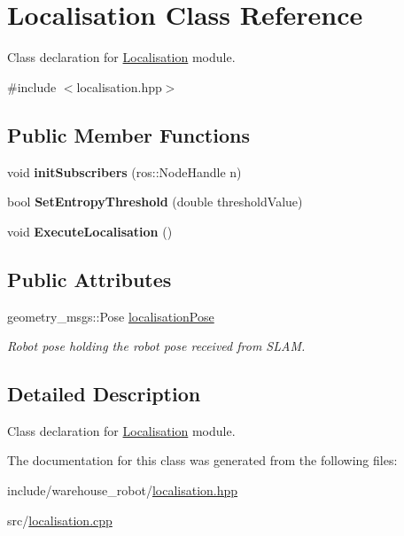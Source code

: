 \hypertarget{classLocalisation}{}\section{Localisation Class Reference}
\label{classLocalisation}


Class declaration for \hyperlink{classLocalisation}{Localisation} module.  




{\ttfamily \#include $<$localisation.\+hpp$>$}

\subsection*{Public Member Functions}
\begin{DoxyCompactItemize}
\item 
void {\bfseries init\+Subscribers} (ros\+::\+Node\+Handle n)\hypertarget{classLocalisation_aa59ba6e5aaac9a5db67d7be6fafe7a84}{}\label{classLocalisation_aa59ba6e5aaac9a5db67d7be6fafe7a84}

\item 
bool {\bfseries Set\+Entropy\+Threshold} (double threshold\+Value)\hypertarget{classLocalisation_afe1372ed43c197e499a9d12822659156}{}\label{classLocalisation_afe1372ed43c197e499a9d12822659156}

\item 
void {\bfseries Execute\+Localisation} ()\hypertarget{classLocalisation_aad76900ec5d2b2a0e0e82f2cf2b08d8d}{}\label{classLocalisation_aad76900ec5d2b2a0e0e82f2cf2b08d8d}

\end{DoxyCompactItemize}
\subsection*{Public Attributes}
\begin{DoxyCompactItemize}
\item 
geometry\+\_\+msgs\+::\+Pose \hyperlink{classLocalisation_ad3f35959fa430a5e993f2b22637d8ced}{localisation\+Pose}\hypertarget{classLocalisation_ad3f35959fa430a5e993f2b22637d8ced}{}\label{classLocalisation_ad3f35959fa430a5e993f2b22637d8ced}

\begin{DoxyCompactList}\small\item\em Robot pose holding the robot pose received from S\+L\+AM. \end{DoxyCompactList}\end{DoxyCompactItemize}


\subsection{Detailed Description}
Class declaration for \hyperlink{classLocalisation}{Localisation} module. 

The documentation for this class was generated from the following files\+:\begin{DoxyCompactItemize}
\item 
include/warehouse\+\_\+robot/\hyperlink{localisation_8hpp}{localisation.\+hpp}\item 
src/\hyperlink{localisation_8cpp}{localisation.\+cpp}\end{DoxyCompactItemize}
